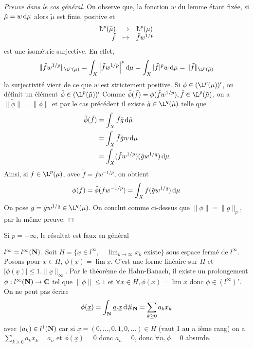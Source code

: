 \begin{proof}[Preuve dans le cas général]
On observe que, la fonction $w$ du lemme étant fixée, si $\tilde{\mu}=w\mathop{}\!\mathrm d\mu$ alors $\tilde{\mu}$ est finie, positive et
\[
    \begin{array}{rcl}
    \L^p(\tilde{\mu})& \to& \L^{p}(\mu) \\
    \tilde{f}&\mapsto &\tilde{f}w^{1/p}
    \end{array}\] est une isométrie surjective.
En effet,
\[ \|\tilde{f}w^{1/p}\|_{\L^p(\mu)}=\int_X\left| \tilde{f}w^{1/p}\right|^p\diff\mu =\int_X|\tilde{f}|^p w\diff\mu = \|\tilde{f}\|_{\L^p(\tilde{\mu})}\]
la surjectivité vient de ce que $w$ est strictement positive.
Si $\phi\in (\L^p(\mu))'$, on définit un élément $\tilde{\phi} \in (\L^p(\tilde{\mu}))'$
Comme $\tilde{\phi}(\tilde{f}) =\phi(\tilde{f}w^{1/p}), \tilde{f}\in  \L^p(\tilde{\mu})$,
on a $\|\tilde{\phi}\|=\|\phi\|$ et par le cas précédent il existe $\tilde{g}\in \L^q(\tilde{\mu})$ telle que
\begin{align*}
\tilde{\phi} (\tilde{f}) &= \int_X\tilde{f}\tilde{g} \mathop{}\!\mathrm d\tilde{\mu}\\
    &= \int_X\tilde{f}\tilde{g} w\mathop{}\!\mathrm d\mu\\
&= \int_X(\tilde{f}w^{1/p})(\tilde{g}w^{1/q}) \mathop{}\!\mathrm d\mu
\end{align*}
Ainsi, si $ f\in \L^p(\mu)$, avec $\tilde{f}=fw^{-1/p}$, on obtient \[\phi(f)= \tilde{\phi}(fw^{-1/p}) =\int_X f(\tilde{g}w^{1/q})\mathop{}\!\mathrm d\mu\]
On pose $g= \tilde{g}w^{1/q} \in \L^q(\mu)$. On conclut comme ci-dessus que $\|\phi\|=\|g\|_p$, par la même preuve.
\end{proof}

\begin{rem}
Si $p=+\infty$, le résultat est faux en général
\end{rem}

\begin{ex}
$l^\infty= l^\infty(\mathbf N)$. Soit $H=\{ \underline{x}\in l^\infty,\quad  \lim_{k\to\infty}x_k \text{ existe}\}$
sous espace fermé de $l^\infty$.
Posons pour $\underline{x}\in H$, $\phi(\underline{x}) = \lim \underline{x}$. C'est une forme linéaire sur $H$ 
et $|\phi(\underline{x})|\leq 1.\| \underline{x}\|_{\infty}$.
Par le théorème de Hahn-Banach, il existe un prolongement $\phi: l^\infty (\mathbf N)\to \mathbf C$ tel que $\|\phi\|\leq 1$
et $\forall \underline{x}\in H,\phi(\underline{x}) =\lim \underline{x}$ donc $\phi\in (l^\infty)'$.
On ne peut pas écrire
\[ \phi(\underline{x}) = \int_{\mathbf N}\underline{a}.\underline{x}\mathop{}\!\mathrm d\#_{\mathbf N}= \sum_{k\geq 0}a_kx_k\]
avec $(a_k)\in l^1(\mathbf N)$ car si $\underline{x}= (0,\dots,0,1,0,\dots) \in H$ (vaut 1 au $n$ ième rang)
on a $\sum_{k\geq 0} a_k x_k = a_n$ et $\phi(\underline{x}) =0$ donc $a_n=0$, donc $\forall n, \phi=0$ absurde.
\end{ex}
